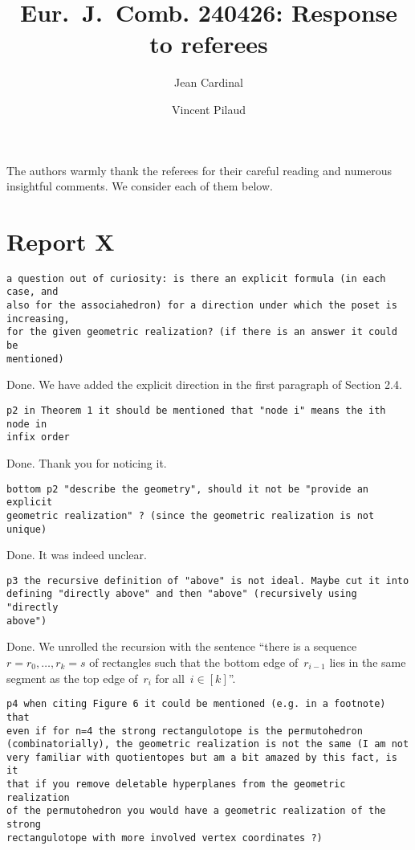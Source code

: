 \documentclass{article}
\title{Eur.~J.~Comb. 240426: Response to referees}
\author{Jean Cardinal \and Vincent Pilaud}
\begin{document}
\maketitle

The authors warmly thank the referees for their careful reading and numerous insightful comments. We consider each of them below.

\section{Report X}

\begin{verbatim}
a question out of curiosity: is there an explicit formula (in each case, and 
also for the associahedron) for a direction under which the poset is increasing, 
for the given geometric realization? (if there is an answer it could be 
mentioned)
\end{verbatim}

Done. We have added the explicit direction in the first paragraph of Section 2.4.

\begin{verbatim}
p2 in Theorem 1 it should be mentioned that "node i" means the ith node in 
infix order
\end{verbatim}

Done. Thank you for noticing it.

\begin{verbatim}
bottom p2 "describe the geometry", should it not be "provide an explicit 
geometric realization" ? (since the geometric realization is not unique)
\end{verbatim}

Done. It was indeed unclear.

\begin{verbatim}
p3 the recursive definition of "above" is not ideal. Maybe cut it into 
defining "directly above" and then "above" (recursively using "directly 
above")
\end{verbatim}

Done. We unrolled the recursion with the sentence ``there is a sequence~${r = r_0, \dots, r_k = s}$ of rectangles such that the bottom edge of~$r_{i-1}$ lies in the same segment as the top edge of~$r_i$ for all~$i \in [k]$''.

\begin{verbatim}
p4 when citing Figure 6 it could be mentioned (e.g. in a footnote) that 
even if for n=4 the strong rectangulotope is the permutohedron 
(combinatorially), the geometric realization is not the same (I am not 
very familiar with quotientopes but am a bit amazed by this fact, is it 
that if you remove deletable hyperplanes from the geometric realization 
of the permutohedron you would have a geometric realization of the strong 
rectangulotope with more involved vertex coordinates ?)
\end{verbatim}
\end{document}
